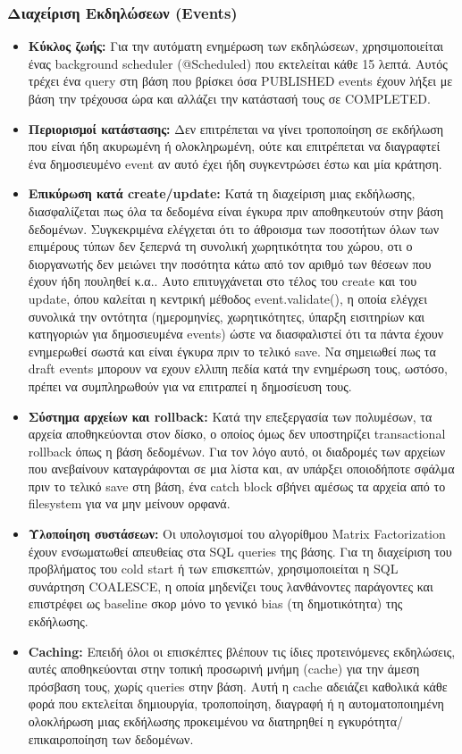 \documentclass[12pt]{fphw}
\newcommand{\en}[1]{\foreignlanguage{english}{#1}}
\begin{document}
\subsubsection{Διαχείριση Εκδηλώσεων (\en{Events})}
\begin{itemize}[leftmargin=*]
    \item \textbf{Κύκλος ζωής:} Για την αυτόματη ενημέρωση των εκδηλώσεων, χρησιμοποιείται ένας background scheduler (\en{@Scheduled}) που εκτελείται κάθε 15 λεπτά. Αυτός τρέχει ένα query στη βάση που βρίσκει όσα \en{PUBLISHED} events έχουν λήξει με βάση την τρέχουσα ώρα και αλλάζει την κατάστασή τους σε \en{COMPLETED}.
    \item \textbf{Περιορισμοί κατάστασης:} Δεν επιτρέπεται να γίνει τροποποίηση σε εκδήλωση που είναι ήδη ακυρωμένη ή ολοκληρωμένη, ούτε και επιτρέπεται να διαγραφτεί ένα δημοσιευμένο event αν αυτό έχει ήδη συγκεντρώσει έστω και μία κράτηση.
    \item \textbf{Επικύρωση κατά create/update:} Κατά τη διαχείριση μιας εκδήλωσης, διασφαλίζεται πως όλα τα δεδομένα είναι έγκυρα πριν αποθηκευτούν στην βάση δεδομένων. Συγκεκριμένα ελέγχεται ότι το άθροισμα των ποσοτήτων όλων των επιμέρους τύπων δεν ξεπερνά τη συνολική χωρητικότητα του χώρου, οτι ο διοργανωτής δεν μειώνει την ποσότητα κάτω από τον αριθμό των θέσεων που έχουν ήδη πουληθεί κ.α.. Αυτο επιτυγχάνεται στο τέλος του create και του update, όπου καλείται η κεντρική μέθοδος \en{event.validate()}, η οποία ελέγχει συνολικά την οντότητα (ημερομηνίες, χωρητικότητες, ύπαρξη εισιτηρίων και κατηγοριών για δημοσιευμένα events) ώστε να διασφαλιστεί ότι τα πάντα έχουν ενημερωθεί σωστά και είναι έγκυρα πριν το τελικό save. Να σημειωθεί πως τα draft events μπορουν να εχουν ελλιπη πεδία κατά την ενημέρωση τους, ωστόσο, πρέπει να συμπληρωθούν για να επιτραπεί η δημοσίευση τους.
    \item \textbf{Σύστημα αρχείων και rollback:} Κατά την επεξεργασία των πολυμέσων, τα αρχεία αποθηκεύονται στον δίσκο, ο οποίος όμως δεν υποστηρίζει transactional rollback όπως η βάση δεδομένων. Για τον λόγο αυτό, οι διαδρομές των αρχείων που ανεβαίνουν καταγράφονται σε μια λίστα και, αν υπάρξει οποιοδήποτε σφάλμα πριν το τελικό save στη βάση, ένα \en{catch} block σβήνει αμέσως τα αρχεία από το filesystem για να μην μείνουν ορφανά.
    \item \textbf{Υλοποίηση συστάσεων:} Οι υπολογισμοί του αλγορίθμου \en{Matrix Factorization} έχουν ενσωματωθεί απευθείας στα SQL queries της βάσης. Για τη διαχείριση του προβλήματος του \en{cold start} ή των επισκεπτών, χρησιμοποιείται η SQL συνάρτηση \en{COALESCE}, η οποία μηδενίζει τους λανθάνοντες παράγοντες και επιστρέφει ως baseline σκορ μόνο το γενικό bias (τη δημοτικότητα) της εκδήλωσης.
    \item \textbf{Caching:} Επειδή όλοι οι επισκέπτες βλέπουν τις ίδιες προτεινόμενες εκδηλώσεις, αυτές αποθηκεύονται στην τοπική προσωρινή μνήμη (cache) για την άμεση πρόσβαση τους, χωρίς queries στην βάση. Αυτή η cache αδειάζει καθολικά κάθε φορά που εκτελείται δημιουργία, τροποποίηση, διαγραφή ή η αυτοματοποιημένη ολοκλήρωση μιας εκδήλωσης προκειμένου να διατηρηθεί η εγκυρότητα/επικαιροποίηση των δεδομένων.
\end{itemize}
\end{document}
